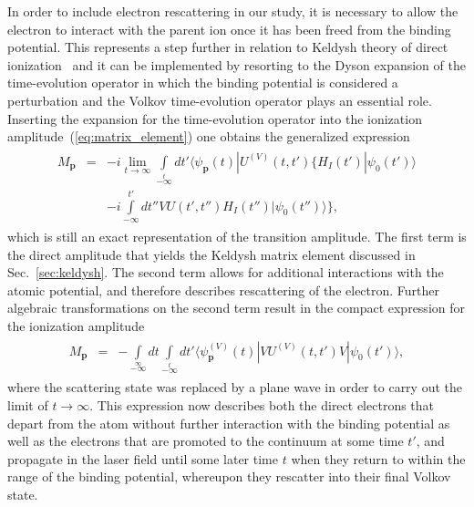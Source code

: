 In order to include electron rescattering in our study, it is
necessary to allow the electron to interact with the parent ion once
it has been freed from the binding potential. This represents a step
further in relation to Keldysh theory of direct
ionization~\cite{KeldyshSFA} and it can be implemented by resorting to
the Dyson expansion of the time-evolution operator in which the
binding potential is considered a perturbation and the Volkov
time-evolution operator plays an essential role. Inserting the
expansion for the time-evolution operator into the ionization
amplitude~(\ref{eq:matrix_element}) one obtains the generalized
expression~\cite{Kopold_1997sfa}
\begin{eqnarray}
\label{eq:mp_2terms}
\begin{split}
M_{\mathbf{p}} & = & -i \lim\limits_{t\to\infty} \int\limits_{-\infty}\limits^{t}
dt' \langle \psi_{\mathbf{p}}(t) | U^{(V)}(t, t') \{ H_{I}(t') | \psi_{0}(t') \rangle \\
& &
-i \int\limits_{-\infty}^{t'} dt'' V U(t', t'') H_{I}(t'') | \psi_{0}(t'') \rangle \},
\end{split}
\end{eqnarray}
which is still an exact representation of the transition
amplitude. The first term is the direct amplitude that yields the
Keldysh matrix element discussed in Sec.~\ref{sec:keldysh}. The second
term allows for additional interactions with the atomic potential, and
therefore describes rescattering of the electron. Further algebraic
transformations on the second term result in the compact expression
for the ionization amplitude~\cite{Kopold_1997sfa}
\begin{eqnarray}
\label{eq:mp_compact}
\begin{split}
M_{\mathbf{p}} & = & - \int\limits_{-\infty}\limits^{\infty} dt
\int\limits_{-\infty}\limits^{t} dt' \langle \psi_{\mathbf{p}}^{(V)}(t)
| V U^{(V)}(t, t') V | \psi_{0}(t') \rangle,
\end{split}
\end{eqnarray}
where the scattering state was replaced by a plane wave in order to
carry out the limit of $t\to\infty$. This expression now describes
both the direct electrons that depart from the atom without further
interaction with the binding potential as well as the electrons that
are promoted to the continuum at some time $t'$, and propagate in the
laser field until some later time $t$ when they return to within the
range of the binding potential, whereupon they rescatter into their
final Volkov state.

